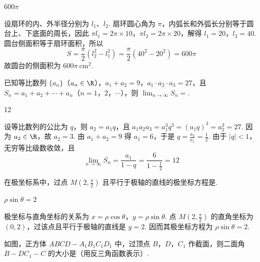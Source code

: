 \begin{answer}
\(600\pi\)
\end{answer}

\begin{solution}
设扇环的内、外半径分别为 \(l_1\)、\(l_2\). 扇环圆心角为 \(\pi\)，内弧长和外弧长分别等于圆台上、下底面的周长，因此
\(\pi l_1=2\pi\times 10\)，\(\pi l_2=2\pi\times 20\)，解得 \(l_1=20\)，\(l_2=40\). 圆台侧面积等于扇环面积，所以
\[
S=\frac{\pi}{2}\left(l_2^2-l_1^2\right)=\frac{\pi}{2}\left(40^2-20^2\right)=600\pi
\]
故圆台的侧面积为 \(600\pi\ \mathrm{cm}^{2}\).
\end{solution}

\begin{problem}
已知等比数列 \(\{a_n\}\)（\(a_n \in \R\)），\(a_1 + a_2 = 9\)，\(a_1 \cdot a_2 \cdot a_3 = 27\)，且 \(S_n = a_1 + a_2 + \cdots + a_n\)（\(n = 1\)，\(2\)，\(\cdots\)），则 \(\displaystyle\lim_{n \to \infty} S_n =\)\fillinblank{}.
\end{problem}

\begin{answer}
12
\end{answer}

\begin{solution}
设等比数列的公比为 \(q\)，则 \(a_2=a_1q\)，且
\(a_1a_2a_3=a_1^3q^3=(a_1q)^3=a_2^3=27\). 因为 \(a_2\in\R\)，故 \(a_2=3\). 由 \(a_1+a_2=9\) 得 \(a_1=6\)，于是 \(q=\frac{a_2}{a_1}=\frac{1}{2}\). 由于 \(|q|<1\)，无穷等比级数收敛，且
\[
\lim_{n\to\infty}S_n=\frac{a_1}{1-q}=\frac{6}{1-\frac{1}{2}}=12
\]
\end{solution}

\begin{problem}
在极坐标系中，过点 \(M\left(2, \frac{\pi}{2}\right)\) 且平行于极轴的直线的极坐标方程是\fillinblank{}.
\end{problem}

\begin{answer}
\(\rho \sin \theta = 2\)
\end{answer}

\begin{solution}
极坐标与直角坐标的关系为 \(x=\rho\cos\theta\)，\(y=\rho\sin\theta\). 点 \(M\left(2,\frac{\pi}{2}\right)\) 的直角坐标为 \((0,2)\)，过该点且平行于极轴的直线是 \(y=2\). 因而其极坐标方程为 \(\rho\sin\theta=2\).
\end{solution}

\begin{problem}
如图，正方体 \(ABCD - A_1B_1C_1D_1\) 中，过顶点 \(B\)，\(D\)，\(C_1\) 作截面，则二面角 \(B - DC_1 - C\) 的大小是\fillinblank{}（用反三角函数表示）.

\begin{minipage}{\linewidth}
\end{minipage}
\end{problem}

